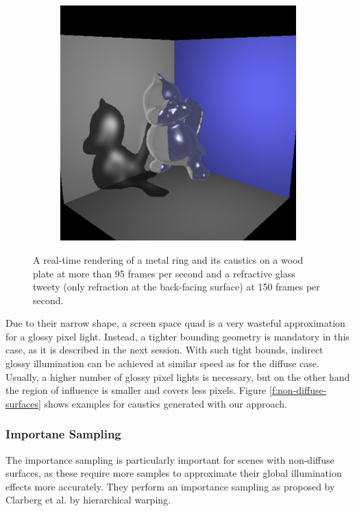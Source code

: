 \begin{figure}
\begin{center}
\begin{subfigure}[b]{.48\textwidth}
		\includegraphics[width=1.\textwidth]{graphics/ir/ir-3-5}
	\end{subfigure}
\end{center}
\caption{A real-time rendering of a metal ring and its caustics on a wood plate at more than 95 frames per second and a refractive glass tweety (only refraction at the back-facing surface) at 150 frames per second.}
\end{figure}

Due to their narrow shape, a screen space quad is a very wasteful approximation for a glossy pixel light. Instead, a tighter bounding geometry is mandatory in this case, as it is described in the next session. With such tight bounds, indirect glossy illumination can be achieved at similar speed as for the diffuse case. Usually, a higher number of glossy pixel lights is necessary, but on the other hand the region of influence is smaller and covers less pixels. Figure \ref{f:non-diffuse-surfaces} shows examples for caustics generated with our approach.




\subsubsection{Importane Sampling}
The importance sampling is particularly important for scenes with non-diffuse surfaces, as these require more samples to approximate their global illumination effects more accurately. They perform an importance sampling as proposed by Clarberg et al\cite{a:WaveletImportanceSampling:EfficientlyEvaluatingProductsofComplexFunctions}. by hierarchical warping. 


